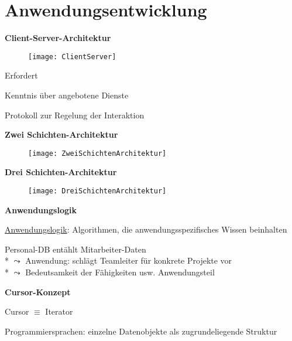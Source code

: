 \section{Anwendungsentwicklung}
\label{sec:anwendungeentwicklung}

\textbf{Client-Server-Architektur}
\begin{figure}[H]\centering\label{ClientServer}\texttt{[image: ClientServer]}\end{figure}
\begin{items}
	\item Erfordert
	\begin{enumeration}
		\item Kenntnis über angebotene Dienste
		\item Protokoll zur Regelung der Interaktion
	\end{enumeration}
\end{items}

\textbf{Zwei Schichten-Architektur}
\begin{figure}[H]\centering\label{ZweiSchichtenArchitektur}\texttt{[image: ZweiSchichtenArchitektur]}\end{figure}

\textbf{Drei Schichten-Architektur}
\begin{figure}[H]\centering\label{DreiSchichtenArchitektur}\texttt{[image: DreiSchichtenArchitektur]}\end{figure}

\textbf{Anwendungslogik}
\begin{items}
	\item \underline{Anwendungslogik}: Algorithmen, die anwendungsspezifisches Wissen beinhalten
	\item Personal-DB entählt Mitarbeiter-Daten
		\\*
		\( \leadsto \) Anwendung: schlägt Teamleiter für konkrete Projekte vor
		\\*
		\( \leadsto \) Bedeutsamkeit der Fähigkeiten usw. Anwendungsteil
\end{items}

\textbf{Cursor-Konzept}
\begin{items}
	\item Cursor \( \equiv \) Iterator
	\item Programmiersprachen: einzelne Datenobjekte als zugrundeliegende Struktur
\end{items}

\newpage

